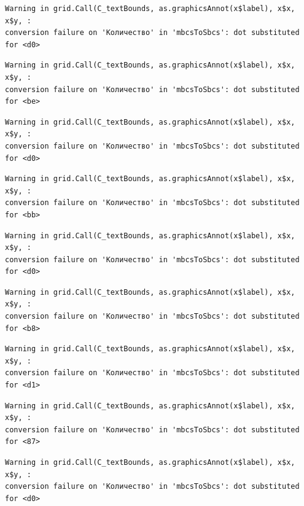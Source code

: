 \documentclass[
  letterpaper,
  DIV=11,
  numbers=noendperiod]{scrreprt}
\theoremstyle{definition}
\theoremstyle{remark}
\begin{document}
\begin{verbatim}
Warning in grid.Call(C_textBounds, as.graphicsAnnot(x$label), x$x, x$y, :
conversion failure on 'Количество' in 'mbcsToSbcs': dot substituted for <d0>
\end{verbatim}

\begin{verbatim}
Warning in grid.Call(C_textBounds, as.graphicsAnnot(x$label), x$x, x$y, :
conversion failure on 'Количество' in 'mbcsToSbcs': dot substituted for <be>
\end{verbatim}

\begin{verbatim}
Warning in grid.Call(C_textBounds, as.graphicsAnnot(x$label), x$x, x$y, :
conversion failure on 'Количество' in 'mbcsToSbcs': dot substituted for <d0>
\end{verbatim}

\begin{verbatim}
Warning in grid.Call(C_textBounds, as.graphicsAnnot(x$label), x$x, x$y, :
conversion failure on 'Количество' in 'mbcsToSbcs': dot substituted for <bb>
\end{verbatim}

\begin{verbatim}
Warning in grid.Call(C_textBounds, as.graphicsAnnot(x$label), x$x, x$y, :
conversion failure on 'Количество' in 'mbcsToSbcs': dot substituted for <d0>
\end{verbatim}

\begin{verbatim}
Warning in grid.Call(C_textBounds, as.graphicsAnnot(x$label), x$x, x$y, :
conversion failure on 'Количество' in 'mbcsToSbcs': dot substituted for <b8>
\end{verbatim}

\begin{verbatim}
Warning in grid.Call(C_textBounds, as.graphicsAnnot(x$label), x$x, x$y, :
conversion failure on 'Количество' in 'mbcsToSbcs': dot substituted for <d1>
\end{verbatim}

\begin{verbatim}
Warning in grid.Call(C_textBounds, as.graphicsAnnot(x$label), x$x, x$y, :
conversion failure on 'Количество' in 'mbcsToSbcs': dot substituted for <87>
\end{verbatim}

\begin{verbatim}
Warning in grid.Call(C_textBounds, as.graphicsAnnot(x$label), x$x, x$y, :
conversion failure on 'Количество' in 'mbcsToSbcs': dot substituted for <d0>
\end{verbatim}
\end{document}
